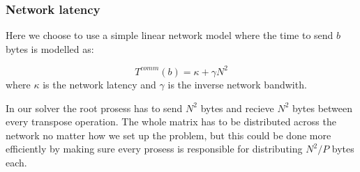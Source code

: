 \subsubsection{Network latency} %
\label{ssub:network_latency}

Here we choose to use a simple linear network model where the time to send $b$ bytes is modelled as:
\begin{center}
	\begin{equation}
		T^{comm}(b) = \kappa + \gamma N^2
	\end{equation}
	where $\kappa$ is the network latency and $\gamma$ is the inverse network bandwith.
\end{center}

In our solver the root prosess has to send $N^2$ bytes and recieve $N^2$ bytes between every transpose operation. The whole matrix has to be distributed across the network no matter how we set up the problem, but this could be done more efficiently by making sure every prosess is responsible for distributing $N^2/P$ bytes each.



